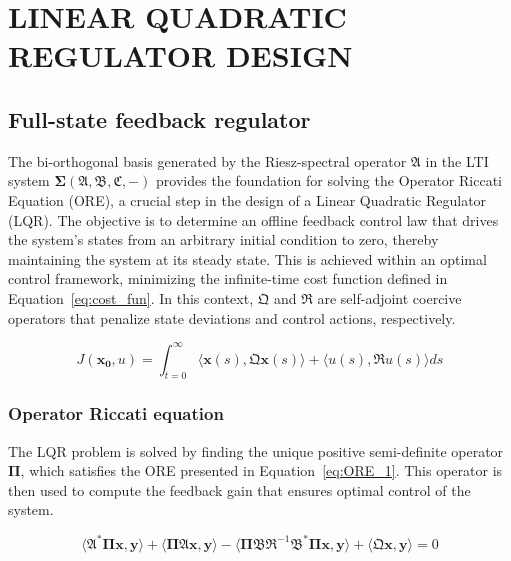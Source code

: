 \section{LINEAR QUADRATIC REGULATOR DESIGN} \label{sec:control}

\subsection{Full-state feedback regulator} \label{sec:fullstate_design}

The bi-orthogonal basis generated by the Riesz-spectral operator $\mathfrak{A}$ in the LTI system $\mathbf{\Sigma(\mathfrak{A},\mathfrak{B},\mathfrak{C},-)}$ provides the foundation for solving the Operator Riccati Equation (ORE), a crucial step in the design of a Linear Quadratic Regulator (LQR). The objective is to determine an offline feedback control law that drives the system's states from an arbitrary initial condition to zero, thereby maintaining the system at its steady state. This is achieved within an optimal control framework, minimizing the infinite-time cost function defined in Equation~\ref{eq:cost_fun}. In this context, $\mathfrak{Q}$ and $\mathfrak{R}$ are self-adjoint coercive operators that penalize state deviations and control actions, respectively.

\begin{equation} \label{eq:cost_fun}
    J(\bm{x_0}, u) = \int_{t=0}^{\infty} \langle \bm{x}(s), \mathfrak{Q} \bm{x}(s)\rangle + \langle u(s), \mathfrak{R} u(s)\rangle ds
\end{equation}

\subsubsection{Operator Riccati equation}

The LQR problem is solved by finding the unique positive semi-definite operator $\mathbf{\Pi}$, which satisfies the ORE presented in Equation~\ref{eq:ORE_1}. This operator is then used to compute the feedback gain that ensures optimal control of the system.

\begin{equation} \label{eq:ORE_1}
    \langle \mathfrak{A}^* \mathbf{\Pi} \bm{x}, \bm{y}\rangle + \langle \mathbf{\Pi} \mathfrak{A} \bm{x}, \bm{y} \rangle - \langle \mathbf{\Pi} \mathfrak{B} \mathfrak{R}^{-1} \mathfrak{B}^* \mathbf{\Pi} \bm{x}, \bm{y}\rangle + \langle \mathfrak{Q} \bm{x}, \bm{y}\rangle = 0
\end{equation}

